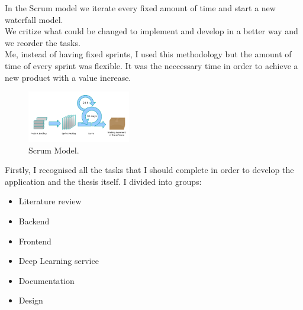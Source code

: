 In the Scrum model we iterate every fixed amount of time and start a new waterfall model. \\
We critize what could be changed to implement and develop in a better way and we reorder the tasks. \\
Me, instead of having fixed sprints, I used this methodology but the amount of time of every sprint was flexible. It was the neccessary time in order to achieve a new product with a value increase. \\

\begin{figure}[H]
    \begin{center}
        \includegraphics[width=0.4\textwidth]{assets/scrum.png}
        \caption{Scrum Model. \cite{Scrum}}
        \label{fig:planification_scrum_model}
    \end{center}
\end{figure}

Firstly, I recognised all the tasks that I should complete in order to develop the application and the thesis itself. I divided into groups:
\begin{itemize}
    \item Literature review
    \item Backend
    \item Frontend
    \item Deep Learning service
    \item Documentation
    \item Design
\end{itemize}

